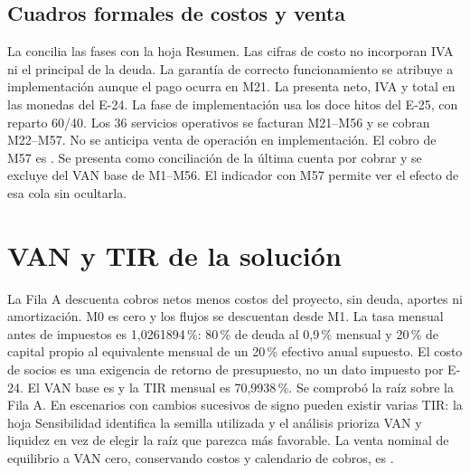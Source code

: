 \subsection{Cuadros formales de costos y venta}\label{sec:eco-venta}
La  concilia las fases con la hoja Resumen. Las cifras de costo no incorporan IVA ni el principal de la deuda. La garantía de correcto funcionamiento se atribuye a implementación aunque el pago ocurra en M21.
La  presenta neto, IVA y total en las monedas del E-24. La fase de implementación usa los doce hitos del E-25, con reparto 60/40. Los 36 servicios operativos se facturan M21--M56 y se cobran M22--M57. No se anticipa venta de operación en implementación.
El cobro de M57 es . Se presenta como conciliación de la última cuenta por cobrar y se excluye del VAN base de M1--M56. El indicador con M57 permite ver el efecto de esa cola sin ocultarla.

\section{VAN y TIR de la solución}\label{sec:eco-indicadores}
La Fila A descuenta cobros netos menos costos del proyecto, sin deuda, aportes ni amortización. M0 es cero y los flujos se descuentan desde M1. La tasa mensual antes de impuestos es 1,0261894\,\%: 80\,\% de deuda al 0,9\,\% mensual y 20\,\% de capital propio al equivalente mensual de un 20\,\% efectivo anual supuesto. El costo de socios es una exigencia de retorno de presupuesto, no un dato impuesto por E-24.
El VAN base es  y la TIR mensual es 70,9938\,\%. Se comprobó la raíz sobre la Fila A. En escenarios con cambios sucesivos de signo pueden existir varias TIR: la hoja Sensibilidad identifica la semilla utilizada y el análisis prioriza VAN y liquidez en vez de elegir la raíz que parezca más favorable. La venta nominal de equilibrio a VAN cero, conservando costos y calendario de cobros, es .

